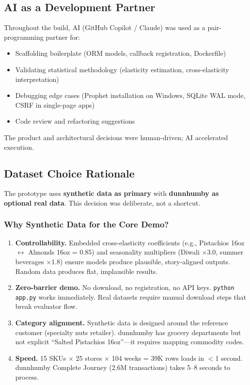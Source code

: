 \documentclass[11pt, a4paper]{article}
\begin{document}
\subsection{AI as a Development Partner}
Throughout the build, AI (GitHub Copilot / Claude) was used as a pair-programming partner for:
\begin{itemize}[leftmargin=1.5em]
    \item Scaffolding boilerplate (ORM models, callback registration, Dockerfile)
    \item Validating statistical methodology (elasticity estimation, cross-elasticity interpretation)
    \item Debugging edge cases (Prophet installation on Windows, SQLite WAL mode, CSRF in single-page apps)
    \item Code review and refactoring suggestions
\end{itemize}
The product and architectural decisions were human-driven; AI accelerated execution.

\vspace{1em}

\subsection{Dataset Choice Rationale}\label{sec:dataset-choice}

The prototype uses \textbf{synthetic data as primary} with \textbf{dunnhumby as optional real data}. This decision was deliberate, not a shortcut.

\subsubsection{Why Synthetic Data for the Core Demo?}

\begin{enumerate}[leftmargin=1.5em]
    \item \textbf{Controllability.} Embedded cross-elasticity coefficients (e.g., Pistachios 16oz $\leftrightarrow$ Almonds 16oz = 0.85) and seasonality multipliers (Diwali $\times$3.0, summer beverages $\times$1.8) ensure models produce plausible, story-aligned outputs. Random data produces flat, implausible results.
    
    \item \textbf{Zero-barrier demo.} No download, no registration, no API keys. \texttt{python app.py} works immediately. Real datasets require manual download steps that break evaluator flow.
    
    \item \textbf{Category alignment.} Synthetic data is designed around the reference customer (specialty nuts retailer). dunnhumby has grocery departments but not explicit ``Salted Pistachios 16oz''---it requires mapping commodity codes.
    
    \item \textbf{Speed.} 15 SKUs $\times$ 25 stores $\times$ 104 weeks = 39K rows loads in $<$1 second. dunnhumby Complete Journey (2.6M transactions) takes 5--8 seconds to process.
\end{enumerate}
\end{document}
